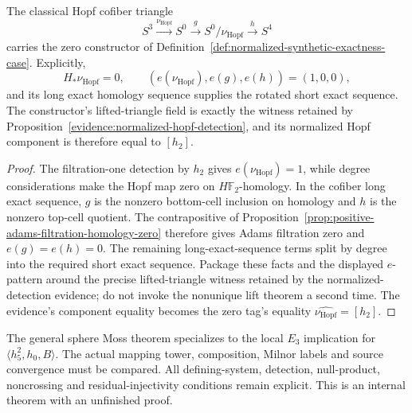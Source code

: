 \begin{lemma}
  \label{lem:normalized-hopf-exactness-case}
  \notready
  The classical Hopf cofiber triangle
  \[
    S^3\xrightarrow{\nu_{\mathrm{Hopf}}}S^0\xrightarrow g
    S^0/\nu_{\mathrm{Hopf}}\xrightarrow hS^4
  \]
  carries the zero constructor of
  Definition~\ref{def:normalized-synthetic-exactness-case}.  Explicitly,
  \[
    H_*\nu_{\mathrm{Hopf}}=0,
    \qquad
    (e(\nu_{\mathrm{Hopf}}),e(g),e(h))=(1,0,0),
  \]
  and its long exact homology sequence supplies the rotated short exact
  sequence.  The constructor's lifted-triangle field is exactly the witness
  retained by Proposition~\ref{evidence:normalized-hopf-detection}, and its
  normalized Hopf component is therefore equal to $[h_2]$.
\end{lemma}

\begin{proof}
  The filtration-one detection by $h_2$ gives
  $e(\nu_{\mathrm{Hopf}})=1$, while degree considerations make the Hopf map
  zero on $H\mathbb F_2$-homology.  In the cofiber long exact sequence, $g$
  is the nonzero bottom-cell inclusion on homology and $h$ is the nonzero
  top-cell quotient.  The contrapositive of
  Proposition~\ref{prop:positive-adams-filtration-homology-zero} therefore
  gives Adams filtration zero and $e(g)=e(h)=0$.  The remaining
  long-exact-sequence terms split by degree into
  the required short exact sequence.  Package these facts and the displayed
  $e$-pattern around the precise lifted-triangle witness retained by the
  normalized-detection evidence; do not invoke the nonunique lift theorem a
  second time.  The evidence's component equality becomes the zero tag's
  equality $\widehat{\nu_{\mathrm{Hopf}}}=[h_2]$.
\end{proof}
\begin{theorem}
  \label{thm:main-local-moss-specialization}
  \notready
  The general sphere Moss theorem specializes to the local $E_3$ implication
  for $\langle h_5^2,h_0,B\rangle$. The actual mapping tower,
  composition, Milnor labels and
  source convergence must be compared. All defining-system, detection,
  null-product, noncrossing and residual-injectivity conditions remain
  explicit. This is an internal theorem with an unfinished proof.
\end{theorem}

